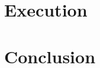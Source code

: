 \documentclass[%
draft, %
a4paper,
UKenglish,
cleveref,
autoref,
thm-restate,
pdfa
]{oasics-v2021}
\begin{document}


\section{Execution}
\label{sec:semantics}



%
%
%
%

\section{Conclusion}
\label{sec:conclusion}



\newpage


%
%  
%
%  
%
%  
\end{document}
